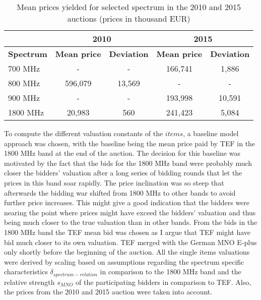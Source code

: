 \begin{table}[ht]
\centering
\begin{tabular}{lcccc}
                                        & \multicolumn{2}{c}{\textbf{2010}}                                               & \multicolumn{2}{c}{\textbf{2015}}                                               \\ \hline
\multicolumn{1}{|l|}{\textbf{Spectrum}} & \multicolumn{1}{l}{\textbf{Mean price}} & \multicolumn{1}{l|}{\textbf{Deviation}} & \multicolumn{1}{l}{\textbf{Mean price}} & \multicolumn{1}{l|}{\textbf{Deviation}} \\ \hline
\multicolumn{1}{|l|}{700 MHz}           & -                                     & \multicolumn{1}{c|}{-}                  & 166,741                               & \multicolumn{1}{c|}{1,886}              \\ \hline
\multicolumn{1}{|l|}{800 MHz}           & 596,079                               & \multicolumn{1}{c|}{13,569}             & -                                     & \multicolumn{1}{c|}{-}                  \\ \hline
\multicolumn{1}{|l|}{900 MHz}           & -                                     & \multicolumn{1}{c|}{-}                  & 193,998                               & \multicolumn{1}{c|}{10,591}             \\ \hline
\multicolumn{1}{|l|}{1800 MHz}          & 20,983                                & \multicolumn{1}{c|}{560}                & 241,423                               & \multicolumn{1}{c|}{5,084}              \\ \hline
\end{tabular}
\caption{Mean prices yielded for selected spectrum in the 2010 and 2015 auctions (prices in thousand EUR)}
\label{tbl:endroundmeanbids}
\end{table}

To compute the different valuation constants of the $items$, a baseline model approach was chosen, with the baseline being the mean price paid by TEF in the 1800 MHz band at the end of the auction. The decision for this baseline was motivated by the fact that the bids for the 1800 MHz band were probably much closer the bidders' valuation after a long series of bidding rounds that let the prices in this band soar rapidly. The price inclination was so steep that afterwards the bidding war shifted from 1800 MHz to other bands to avoid further price increases. This might give a good indication that the bidders were nearing the point where prices might have exceed the bidders' valuation and thus being much closer to the true valuation than in other bands.
From the bids in the 1800 MHz band the TEF mean bid was chosen as I argue that TEF might have bid much closer to its own valuation. TEF merged with the German MNO E-plus only shortly before the beginning of the auction. 
All the single items valuations were derived by scaling based on assumptions regarding the spectrum specific characteristics $ \delta_{spectrum-relation} $ in comparison to the 1800 MHz band and the relative strength $ s_{MNO} $ of the participating bidders in comparison to TEF. Also, the prices from the 2010 and 2015 auction were taken into account.

